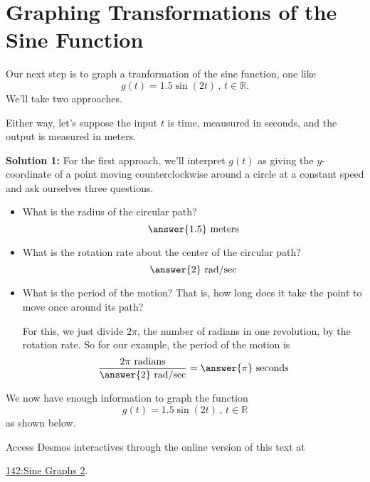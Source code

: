 \documentclass{ximera}
\begin{document}
\section{Graphing Transformations of the Sine Function}
\begin{example} \label{Ed7ugg}

Our next step is to graph a tranformation of the sine function, one like
\[
    g(t) = 1.5\sin (2t) \, , \, t\in \mathbb{R} .
\]
We'll take two approaches.

Either way, let's suppose the input $t$ is time, meausured in seconds, and the output is measured in meters. 


{\bf Solution 1:} For the first approach, we'll interpret $g(t)$ as giving the $y$-coordinate of a point moving counterclockwise around a circle at a constant speed and ask ourselves three questions.

\begin{itemize}
\item{
\begin{question} \label{Qdst656}
What is the radius of the circular path?  
\[
\answer{1.5} \text{ meters}
\]
\end{question}
}

\item{
\begin{question}  \label{Qdfsatt56}
What is the rotation rate about the center of the circular path?
\[
 \answer{2} \text{ rad/sec}
\]
\end{question}
}

\item{
\begin{question}  \label{Qdfsdsg56}
What is the period of the motion? That is, how long does it take the point to move once around its path?

For this, we just divide $2\pi$, the number of radians in one revolution, by the rotation rate. So for our example, the period of the motion is
\[
    \frac{2\pi \text{ radians}}{\answer{2}\text{ rad/sec}}   = \answer{\pi} \text{ seconds}
\]
\end{question}
}
\end{itemize}

We now have enough information to graph the function 
\[
    g(t) = 1.5 \sin (2t) \, , \, t \in \mathbb{R} 
\]
as shown below.

Access Desmos interactives through the online version of this text at
 
\href{https://www.desmos.com/calculator/txuiehcciu}{142:Sine Graphs 2}.


\end{example}
\end{document}
